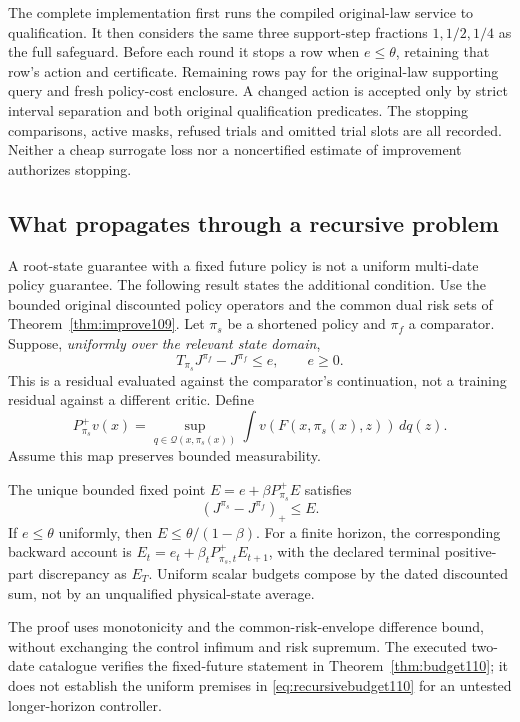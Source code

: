 The complete implementation first runs the compiled original-law service to qualification. It then considers the same three support-step fractions $1,1/2,1/4$ as the full safeguard. Before each round it stops a row when $e\le\theta$, retaining that row's action and certificate. Remaining rows pay for the original-law supporting query and fresh policy-cost enclosure. A changed action is accepted only by strict interval separation and both original qualification predicates. The stopping comparisons, active masks, refused trials and omitted trial slots are all recorded. Neither a cheap surrogate loss nor a noncertified estimate of improvement authorizes stopping.

\subsection{What propagates through a recursive problem}
A root-state guarantee with a fixed future policy is not a uniform multi-date policy guarantee. The following result states the additional condition. Use the bounded original discounted policy operators and the common dual risk sets of Theorem~\ref{thm:improve109}. Let $\pi_s$ be a shortened policy and $\pi_f$ a comparator. Suppose, \emph{uniformly over the relevant state domain},
\begin{equation}\label{eq:recursivebudget110}
 T_{\pi_s}J^{\pi_f}-J^{\pi_f}\le e,
 \qquad e\ge0.
\end{equation}
This is a residual evaluated against the comparator's continuation, not a training residual against a different critic. Define
\[
 P^+_{\pi_s}v(x)=\sup_{q\in\mathcal Q(x,\pi_s(x))}
                       \int v(F(x,\pi_s(x),z))\,dq(z).
\]
Assume this map preserves bounded measurability.
\begin{proposition}\label{prop:compose110}
The unique bounded fixed point $E=e+\beta P^+_{\pi_s}E$ satisfies
\begin{equation}\label{eq:composedgain110}
 (J^{\pi_s}-J^{\pi_f})_+\le E.
\end{equation}
If $e\le\theta$ uniformly, then $E\le\theta/(1-\beta)$. For a finite horizon, the corresponding backward account is
$E_t=e_t+\beta_tP^+_{\pi_s,t}E_{t+1}$, with the declared terminal positive-part discrepancy as $E_T$. Uniform scalar budgets compose by the dated discounted sum, not by an unqualified physical-state average.
\end{proposition}

The proof uses monotonicity and the common-risk-envelope difference bound, without exchanging the control infimum and risk supremum. The executed two-date catalogue verifies the fixed-future statement in Theorem~\ref{thm:budget110}; it does not establish the uniform premises in \eqref{eq:recursivebudget110} for an untested longer-horizon controller.

